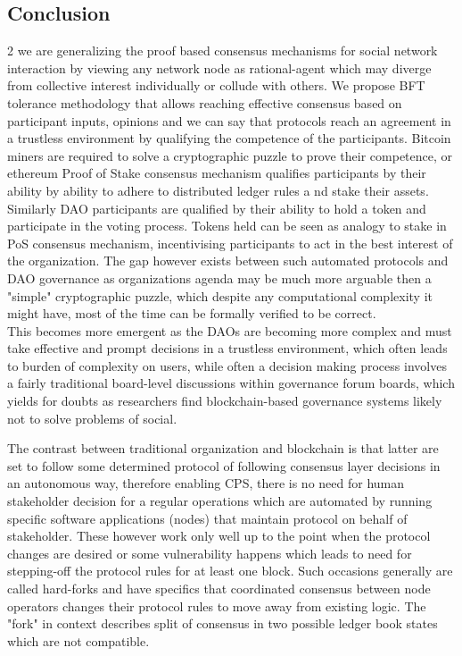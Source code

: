 \documentclass{article}
\begin{document}
\begin{CJK}{UTF8}{gbsn}
\begin{multicols}{2}
\section{Conclusion}

\end{multicols}{2}
we are generalizing the proof based consensus mechanisms for social network interaction by viewing any network node as rational-agent which may diverge from collective interest \cite{Philip2019} individually or collude with others. We propose BFT tolerance methodology that allows reaching effective consensus based on participant inputs, opinions and  we can say that protocols reach an agreement in a trustless environment by qualifying the competence of the participants. Bitcoin miners are required to solve a cryptographic puzzle to prove their competence, or ethereum Proof of Stake consensus mechanism qualifies participants by their ability by ability to adhere to distributed ledger rules a   nd stake their assets. \\ Similarly DAO participants are qualified by their ability to hold a token and participate in the voting process. Tokens held can be seen as analogy to stake in PoS consensus mechanism, incentivising participants to act in the best interest of the organization. The gap however exists between such automated protocols and DAO governance as organizations agenda may be much more arguable then a "simple" cryptographic puzzle, which despite any computational complexity it might have, most of the time can be formally verified to be correct.\\
This becomes more emergent as the DAOs are becoming more complex and must take effective and prompt decisions in a trustless environment, which often leads to burden of complexity on users, while often a decision making process involves a fairly traditional board-level discussions within governance forum boards, which yields for doubts as researchers find blockchain-based governance systems likely not to solve problems of social.

The contrast between traditional organization and blockchain is that latter are set to follow some determined protocol of following consensus layer decisions in an autonomous way, therefore enabling CPS, there is no need for human stakeholder decision for a regular operations which are automated by running specific software applications (nodes) that maintain protocol on behalf of stakeholder.
These however work only well up to the point when the protocol changes are desired or some vulnerability happens which leads to need for stepping-off the protocol rules for at least one block. Such occasions generally are called hard-forks and have specifics that coordinated consensus between node operators changes their protocol rules to move away from existing logic. The "fork" in context describes split of consensus in two possible ledger book states which are not compatible.



\clearpage\end{CJK}
\end{document}
